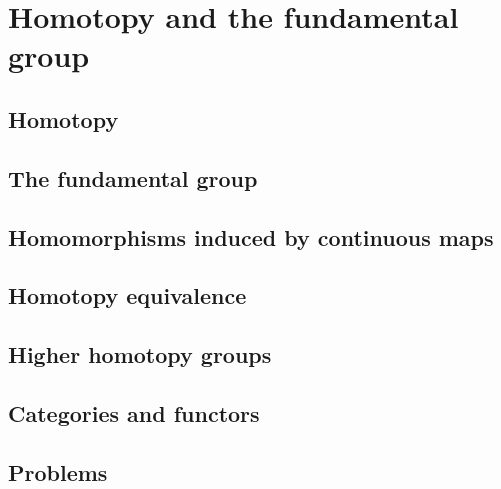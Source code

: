 \chapter{Homotopy and the fundamental group}
\section{Homotopy}
\section{The fundamental group}
\section{Homomorphisms induced by continuous maps}
\section{Homotopy equivalence}
\section{Higher homotopy groups}
\section{Categories and functors}
\section{Problems}

